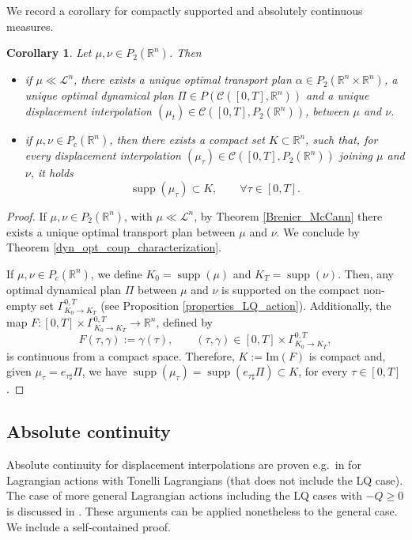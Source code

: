 \documentclass[reqno]{amsart}
\DeclareMathOperator{\supp}{supp}
\theoremstyle{plain}
\newtheorem{cor}[thm]{Corollary}
\theoremstyle{definition}
\theoremstyle{remark}
\begin{document}
        We record a corollary for compactly supported and absolutely continuous measures. 
        \begin{cor}\label{cor_dyn_opt_coup}
		Let $\mu, \nu\in P_2(\mathbb{R}^n)$. Then
		\begin{itemize}
			\item if $\mu\ll\mathscr{L}^n$, there exists a unique optimal transport plan $\alpha\in P_2(\mathbb{R}^n\times\mathbb{R}^n)$, a unique optimal dynamical plan $\Pi\in P(\mathcal{C}([0,T],\mathbb{R}^n))$ and a unique displacement interpolation $(\mu_t)\in \mathcal{C}([0,T],P_2(\mathbb{R}^n))$, between $\mu$ and $\nu$.
			\item if $\mu,\nu\in P_c(\mathbb{R}^n)$, then there exists a compact set $K\subset\mathbb{R}^n$, such that, for every displacement interpolation $(\mu_\tau)\in \mathcal{C}([0,T],P_2(\mathbb{R}^n))$ joining $\mu$ and $\nu$, it holds
			\begin{equation}
				\supp(\mu_\tau)\subset K,\qquad\forall \tau\in[0,T].
			\end{equation}
		\end{itemize}
	\end{cor}
		\begin{proof}
			If $\mu, \nu\in P_2(\mathbb{R}^n)$, with $\mu\ll\mathscr{L}^n$, by Theorem \ref{Brenier_McCann} there exists a unique optimal transport plan between $\mu$ and $\nu$. We conclude by Theorem \ref{dyn_opt_coup_characterization}. 
			
			If $\mu,\nu\in P_c(\mathbb{R}^n)$, we define $K_0=\supp(\mu)$ and $K_T=\supp(\nu)$. Then, any optimal dynamical plan $\Pi$ between $\mu$ and $\nu$ is supported on the compact non-empty set $\Gamma^{0,T}_{K_0\to K_T}$ (see Proposition \ref{properties_LQ_action}). Additionally, the map $F:[0,T]\times\Gamma^{0,T}_{K_0\to K_T}\to\mathbb{R}^n$, defined by
			\begin{equation}
				F(\tau,\gamma):=\gamma(\tau),\qquad (\tau,\gamma)\in [0,T]\times \Gamma^{0,T}_{K_0\to K_T},
			\end{equation}
			is continuous from a compact space. Therefore, $K:=\mathrm{Im}(F)$ is compact and, given $\mu_\tau=e_{\tau\sharp}\Pi$, we have $\supp(\mu_\tau)=\supp(e_{\tau\sharp}\Pi)\subset K$, for every $\tau\in[0,T]$.
		\end{proof}
\subsection{Absolute continuity} 

Absolute continuity for displacement interpolations are proven e.g.\ in \cite[Theorem 5.1]{FathiFigalli} for Lagrangian actions with Tonelli Lagrangians (that does not include the LQ case). The case of more general Lagrangian actions including the LQ cases with $-Q\geq 0$ is discussed in \cite[Theorem 4.1]{agrachev2007opttransnonholconst}. These arguments can be applied nonetheless to the general case. We include a self-contained proof.
\end{document}
